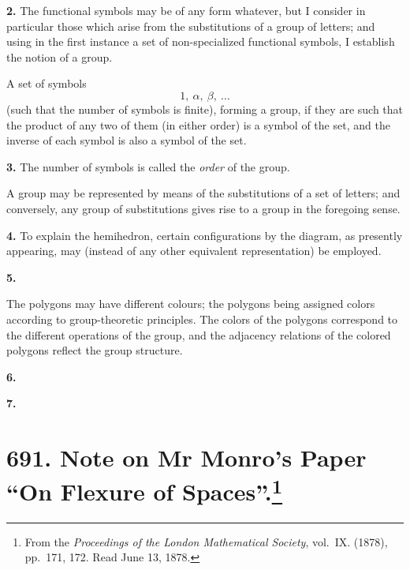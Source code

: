 \documentclass[12pt,a4paper]{article}
\theoremstyle{definition}
\begin{document}
\medskip
\noindent\textbf{2.}\quad
The functional symbols may be of any form whatever, but I consider in particular those which arise from the substitutions of a group of letters; and using in the first instance a set of non-specialized functional symbols, I establish the notion of a group.

A set of symbols
\[
1,\ \alpha,\ \beta,\ \dots
\]
(such that the number of symbols is finite), forming a group, if they are such that the product of any two of them (in either order) is a symbol of the set, and the inverse of each symbol is also a symbol of the set.

\medskip
\noindent\textbf{3.}\quad
The number of symbols is called the \textit{order} of the group.

A group may be represented by means of the substitutions of a set of letters; and conversely, any group of substitutions gives rise to a group in the foregoing sense.

\medskip
\noindent\textbf{4.}\quad
To explain the hemihedron, certain configurations by the diagram, as presently appearing, may (instead of any other equivalent representation) be employed.

\medskip
\noindent\textbf{5.}

The polygons may have different colours; the polygons being assigned colors according to group-theoretic principles. The colors of the polygons correspond to the different operations of the group, and the adjacency relations of the colored polygons reflect the group structure.

\medskip
\noindent\textbf{6.}

\medskip
\noindent\textbf{7.}

\newpage
\section[Note on Mr Monro's Paper ``On Flexure of Spaces'']{691. Note on Mr Monro's Paper ``On Flexure of Spaces''.\footnote{From the \textit{Proceedings of the London Mathematical Society}, vol.\ IX. (1878), pp.\ 171, 172. Read June 13, 1878.}}
\end{document}
